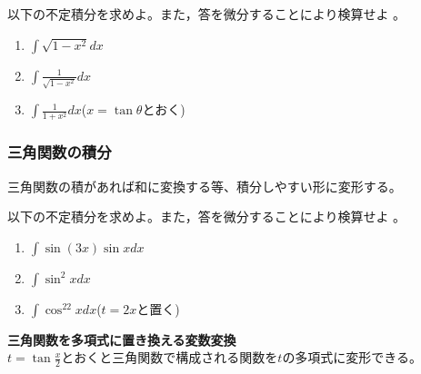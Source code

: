 \documentclass[twocolumn,11pt]{jarticle}
\begin{document}
\exercise
以下の不定積分を求めよ。また，答を微分することにより検算せよ
。
\begin{enumerate}
\item \label{item:sqrt(1-x2)}
  $\displaystyle\int \sqrt{1-x^2} dx$
\item \label{item:1/sqrt(1-x2)}
  $\displaystyle\int \frac{1}{\sqrt{1-x^2}}dx$\quad
\item \label{item:1/1+x2}
$\displaystyle\int\frac{1}{1+x^2}dx$\quad($x=\tan\theta$とおく)
\end{enumerate}

\subsubsection{三角関数の積分}
三角関数の積があれば和に変換する等、積分しやすい形に変形する。

\exercise
以下の不定積分を求めよ。また，答を微分することにより検算せよ
。
\begin{enumerate}
\item \label{item:sin3xsinx}$\displaystyle\int\sin(3x)\sin xdx$
\item \label{item:sin2x}$\displaystyle\int \sin^2 x dx$
\item \label{item:cos22x}$\displaystyle\int \cos^22xdx$\quad ($t=2x$と置く)
\end{enumerate}


\noindent
\textbf{三角関数を多項式に置き換える変数変換}\\
$\displaystyle t=\tan\frac{x}{2}$とおくと三角関数で構成される関数を$t$の多項式に変形できる。
\end{document}
